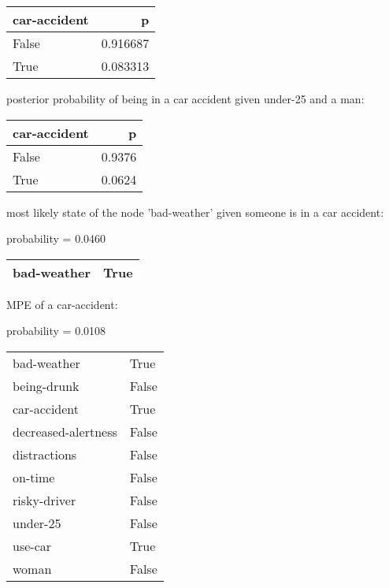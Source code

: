 
\vfill\vfill
\begin{tabular}{lr}
\toprule
 car-accident &        p \\
\midrule
        False & 0.916687 \\
         True & 0.083313 \\
\bottomrule
\end{tabular}

posterior probability of being in a car accident given under-25 and a man:
\vfill
\begin{tabular}{lr}
\toprule
 car-accident &      p \\
\midrule
        False & 0.9376 \\
         True & 0.0624 \\
\bottomrule
\end{tabular}

\vfill\vfill

\vfill\vfill

most likely state of the node 'bad-weather' given someone is in a car accident:

probability = 0.0460
\vfill
\begin{tabular}{ll}
\toprule
bad-weather &  True \\
\bottomrule
\end{tabular}

\vfill\vfill

\vfill\vfill
MPE of a car-accident:

probability = 0.0108
\vfill
\begin{tabular}{ll}
\toprule
bad-weather         &   True \\
being-drunk         &  False \\
car-accident        &   True \\
decreased-alertness &  False \\
distractions        &  False \\
on-time             &  False \\
risky-driver        &  False \\
under-25            &  False \\
use-car             &   True \\
woman               &  False \\
\bottomrule
\end{tabular}

\vfill\vfill

\vfill\vfill
